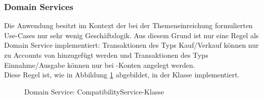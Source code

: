 \subsubsection*{Domain Services}
Die Anwendung besitzt im Kontext der bei der Themeneinreichung formulierten Use-Cases nur sehr wenig Geschäftslogik. Aus diesem Grund ist nur eine Regel als Domain Service implementiert: Transaktionen des Typs Kauf/Verkauf können nur zu Accounts von  hinzugefügt werden und Transaktionen des Typs Einnahme/Ausgabe können nur bei -Konten angelegt werden.\\
Diese Regel ist, wie in Abbildung \ref{fig:domainservice} abgebildet, in der Klasse  implementiert.
\vfill
\begin{figure}[!htb]
    \caption[Domain Service]{Domain Service: CompatibilityService-Klasse}
    \label{fig:domainservice}
\end{figure}
\vfill